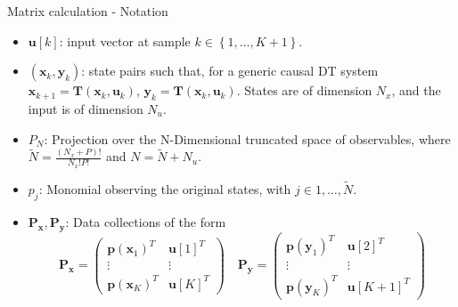 \documentclass{beamer}
\begin{document}
\begin{frame}{Matrix calculation - Notation}
    \begin{itemize}
        \item $\mathbf{u}\left[k\right]$: input vector at sample $k \in \left\{1,\dots,K+1\right\}$.
        \item $\left(\mathbf{x}_k,\mathbf{y}_k\right)$: state pairs such that, for a generic causal DT system $\mathbf{x}_{k+1} = \mathbf{T}(\mathbf{x}_k , \mathbf{u}_k)$, $\mathbf{y}_k = \mathbf{T}(\mathbf{x}_k, \mathbf{u}_k)$. States are of dimension $N_x$, and the input is of dimension $N_u$.
        \item $P_N$: Projection over the N-Dimensional truncated space of observables, where $\tilde{N} = \frac{\left(N_x + P\right)!}{N_x! P!}$ and $N = \tilde{N} + N_u$.
        \item $p_j$: Monomial observing the original states, with $j \in {1,\dots,\tilde{N}}$.
        \item $\mathbf{P_x},\mathbf{P_y}$: Data collections of the form
            \begin{equation}
                \mathbf{P_x} = 
                \begin{pmatrix}
                    \mathbf{p}\left(\mathbf{x}_1\right)^T   &   \mathbf{u}\left[1\right]^T  \\
                    \vdots  &   \vdots  \\
                    \mathbf{p}\left(\mathbf{x}_K\right)^T   &   \mathbf{u}\left[K\right]^T
                \end{pmatrix}
                \quad
                \mathbf{P_y} = 
                \begin{pmatrix}
                    \mathbf{p}\left(\mathbf{y}_1\right)^T   &   \mathbf{u}\left[2\right]^T  \\
                    \vdots  &   \vdots  \\
                    \mathbf{p}\left(\mathbf{y}_K\right)^T   &   \mathbf{u}\left[K+1\right]^T
                \end{pmatrix}
            \end{equation}
    \end{itemize}
\end{frame}
\end{document}
